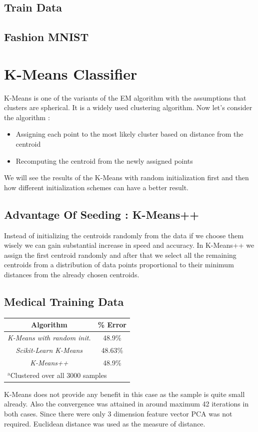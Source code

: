 \documentclass[conference]{IEEEtran}
\begin{document}
    \subsection{Train Data}
    
    \subsection{Fashion MNIST}
    
    \section{\textbf{K-Means Classifier}}
    K-Means is one of the variants of the EM algorithm with the assumptions that clusters are spherical. It is a widely used clustering algorithm. Now let's consider the algorithm :
    \begin{itemize}
        \item Assigning each point to the most likely cluster based on distance from the centroid
        \item Recomputing the centroid from the newly assigned points
    \end{itemize} 
    We will see the results of the K-Means with random initialization first and then how different initialization schemes can have a better result.
    \subsection{Advantage Of Seeding : \textbf{K-Means++}}
    Instead of initializing the centroids randomly from the data if we choose them wisely we can gain substantial increase in speed and accuracy. In K-Means++ we assign the first centroid randomly and after that we select all the remaining centroids from a distribution of data points proportional to their minimum distances from the already chosen centroids.
    \subsection{Medical Training Data}
    \begin{table}[htbp]
    \begin{center}
    \begin{tabular}{|c|c|}
    \hline
    \textbf{Algorithm}&\textbf{\% Error} \\
    \hline
    \textit{K-Means with random init.} & 48.9\%\\
    \hline
    \textit{Scikit-Learn K-Means}& 48.63\%\\
    \hline
    \textit{K-Means++}&48.9\%\\
    \hline
    \multicolumn{4}{l}{$^{\mathrm{a}}$Clustered over all 3000 samples}
    \end{tabular}
    \label{tab1}
    \end{center}
    \end{table}
    K-Means does not provide any benefit in this case as the sample is quite small already. Also the convergence was attained in around maximum 42 iterations in both cases. Since there were only 3 dimension feature vector PCA was not required. Euclidean distance was used as the measure of distance.
\end{document}
